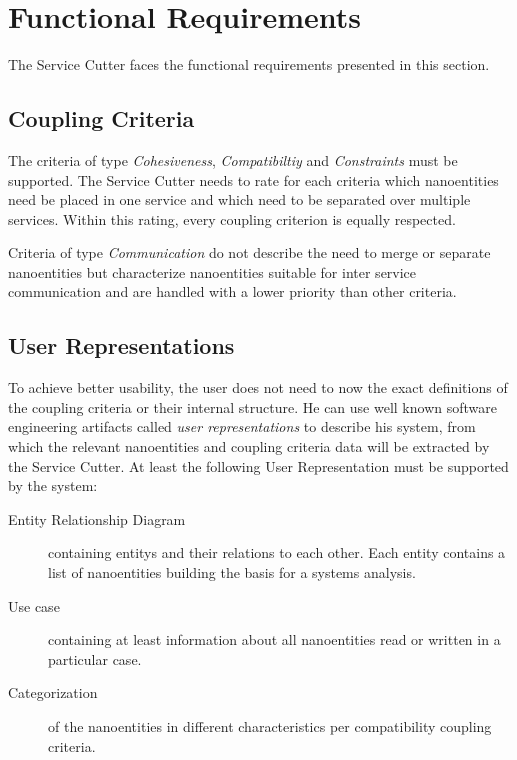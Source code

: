 \section{Functional Requirements}
\label{sec:functionalRequirements}

The Service Cutter faces the functional requirements presented in this
section.


\subsection{Coupling Criteria}

The criteria of type \textit{Cohesiveness}, \textit{Compatibiltiy} and \textit{Constraints} must be supported. The Service Cutter needs to rate for each criteria which nanoentities need be placed in one service and which need to be separated over multiple services. Within this rating, every coupling criterion is equally respected.

Criteria of type \textit{Communication} do not describe the need to merge or separate nanoentities but characterize nanoentities suitable for inter service communication and are handled with a lower priority than other criteria. 

\subsection{User Representations}

To achieve better usability, the user does not need to now the exact definitions of the coupling criteria or their internal structure. He can use well known software engineering artifacts called \textit{user representations} to describe his system, from which the relevant nanoentities and coupling criteria data will be extracted by the Service Cutter. At least the following User Representation must be supported by the system:

\begin{description}
	\item[Entity Relationship Diagram] containing \glspl{entity} and their relations to each other. Each entity contains a list of nanoentities building the basis for a systems analysis.
	\item[Use case] containing at least information about all nanoentities read or written in a particular case. 
	\item[Categorization] of the nanoentities in different characteristics per compatibility coupling criteria. 
\end{description}

